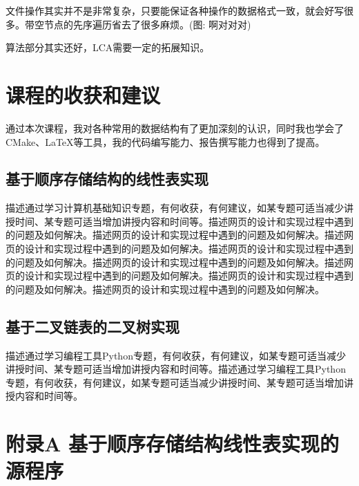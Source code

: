\documentclass[supercite]{Experimental_Report}
\theoremstyle{definition}
\begin{document}
文件操作其实并不是非常复杂，只要能保证各种操作的数据格式一致，就会好写很多。带空节点的先序遍历省去了很多麻烦。(图: 啊对对对)

算法部分其实还好，LCA需要一定的拓展知识。

\newpage

\section{课程的收获和建议}

通过本次课程，我对各种常用的数据结构有了更加深刻的认识，同时我也学会了CMake、LaTeX等工具，我的代码编写能力、报告撰写能力也得到了提高。

\subsection{基于顺序存储结构的线性表实现}

描述通过学习计算机基础知识专题，有何收获，有何建议，如某专题可适当减少讲授时间、某专题可适当增加讲授内容和时间等。描述网页的设计和实现过程中遇到的问题及如何解决。描述网页的设计和实现过程中遇到的问题及如何解决。描述网页的设计和实现过程中遇到的问题及如何解决。描述网页的设计和实现过程中遇到的问题及如何解决。描述网页的设计和实现过程中遇到的问题及如何解决。描述网页的设计和实现过程中遇到的问题及如何解决。描述网页的设计和实现过程中遇到的问题及如何解决。描述网页的设计和实现过程中遇到的问题及如何解决。

\subsection{基于二叉链表的二叉树实现}

描述通过学习编程工具Python专题，有何收获，有何建议，如某专题可适当减少讲授时间、某专题可适当增加讲授内容和时间等。描述通过学习编程工具Python专题，有何收获，有何建议，如某专题可适当减少讲授时间、某专题可适当增加讲授内容和时间等。



\appendix

\section{附录A 基于顺序存储结构线性表实现的源程序}
\end{document}
